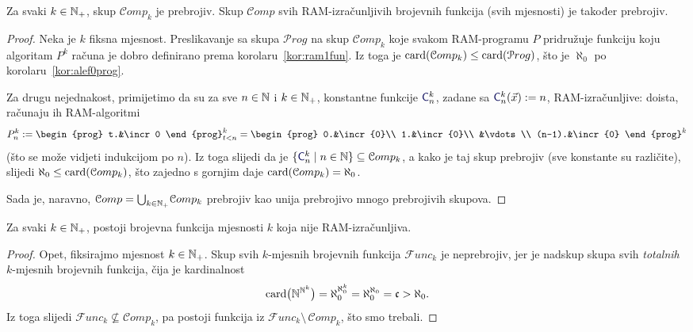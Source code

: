 \begin{teorem}\label{tm:alef0izr}
Za svaki $k\in{\mathbb N}_+$, skup $\mathcal Comp_k$ je prebrojiv. Skup $\mathcal Comp$ svih RAM-izračunljivih brojevnih funkcija (svih mjesnosti) je također prebrojiv.
\end{teorem}
\begin{proof}
Neka je $k$ fiksna mjesnost. Preslikavanje
sa skupa $\mathcal Prog$ na skup $\mathcal Comp_k$
koje svakom RAM-programu $P$ pridružuje funkciju koju algoritam $P^k$ računa je dobro definirano prema korolaru~\ref{kor:ram1fun}. Iz toga je $\operatorname{card}(\mathcal Comp_k)\le\operatorname{card}(\mathcal Prog)$, što je $\aleph_0$ po korolaru~\ref{kor:alef0prog}.

Za drugu nejednakost, primijetimo da su za sve $n\in{\mathbb N}$ i $k\in{\mathbb N}_+$, konstantne funkcije $\f{C}_n^k$, zadane sa
$\f{C}_n^k(\vec x):=n$, RAM-izračunljive: doista, računaju ih RAM-algoritmi
\begin{equation}\label{eq:konstRAM}
    P_n^k:=\begin{prog}
    t.&\incr0
    \end{prog}_{t<n}^k=\begin{prog}
    0.&\incr{0}\\
    1.&\incr{0}\\
    &\vdots\\
    (n-1).&\incr{0}
    \end{prog}^k
\end{equation}
(što se može vidjeti indukcijom po $n$).
Iz toga slijedi da je $\{\f{C}_n^k\mid n\in\N\}\subseteq\mathcal Comp_k$, a kako je taj skup prebrojiv (sve konstante su različite), slijedi $\aleph_0\le\operatorname{card}(\mathcal Comp_k)$, što zajedno s gornjim daje $\operatorname{card}(\mathcal Comp_k)=\aleph_0$.

Sada je, naravno, $\mathcal Comp=\bigcup_{k\in{\mathbb N}_+}\!\mathcal Comp_k$ prebrojiv kao unija prebrojivo mnogo prebrojivih skupova.
\end{proof}

\begin{korolar}\label{kor:exneizrk}
Za svaki $k\in{\mathbb N}_+$, postoji brojevna funkcija mjesnosti $k$ koja nije RAM-izračunljiva.
\end{korolar}
\begin{proof}
Opet, fiksirajmo mjesnost $k\in{\mathbb N}_+$. Skup svih $k$-mjesnih brojevnih funkcija $\mathcal Func_k$ je neprebrojiv, jer je nadskup skupa svih \emph{totalnih} $k$-mjesnih brojevnih funkcija, čija je kardinalnost
\begin{equation}
    \operatorname{card}\bigl({\mathbb N}^{{\mathbb N}^k}\bigr)=\aleph_0^{\aleph_0^k}=\aleph_0^{\aleph_0}=\mathfrak c>\aleph_0\text.
\end{equation}
Iz toga slijedi $\mathcal Func_k\not\subseteq\mathcal Comp_k$, pa postoji funkcija iz $\mathcal Func_k\setminus\,\mathcal Comp_k$, što smo trebali.
\end{proof}

